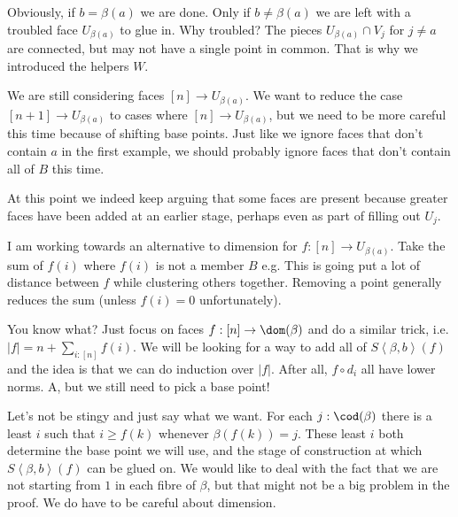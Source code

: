 \documentclass{tac}
\newcommand\of{:}
\newcommand\tuplet[1]{\left\langle #1 \right\rangle}
\begin{document}
Obviously, if $b=\beta(a)$ we are done. Only if $b\neq\beta(a)$ we are left with a troubled face $U_{\beta(a)}$ to glue in. Why troubled? The pieces $U_{\beta(a)}\cap V_j$ for $j\neq a$ are connected, but may not have a single point in common. That is why we introduced the helpers $W$.

We are still considering faces $[n]\to U_{\beta(a)}$. We want to reduce the case $[n + 1]\to U_{\beta(a)}$ to cases where $[n]\to U_{\beta(a)}$, but we need to be more careful this time because of shifting
base points.
Just like we ignore faces that don't contain $a$ in the first example, we should probably ignore faces that don't contain all of $B$ this time.

At this point we indeed keep arguing that some faces are present because
greater faces have been added at an earlier stage, perhaps even as part of filling out $U_j$.

I am working towards an alternative to dimension for $f:[n]\to U_{\beta(a)}$. Take the sum of $f(i)$ where $f(i)$ is not a member $B$ e.g.
This is going put a lot of distance between $f$ while clustering others together. Removing a point generally reduces the sum (unless $f(i) = 0$ unfortunately). 

You know what? Just focus on faces $f:[n]\to \dom(\beta)$ and do a similar trick, i.e. $|f| = n + \sum_{i\of [n]} f(i)$. We
will be looking for a way to add all of $S\tuplet{\beta,b}(f)$ and the
idea is that we can do induction over $|f|$. After all, $f\circ d_i$ all have lower norms. A, but we still need to pick a base point!

Let's not be stingy and just say what we want.
For each $j\of \cod(\beta)$ there is a least $i$ such that $i \geq f(k)$ whenever $\beta(f(k)) = j$. These least $i$ both determine the base point we will use, and the stage of
construction at which $S\tuplet{\beta,b}(f)$ can be glued on. We would
like to deal with the fact that we are not starting from $1$ in each fibre of $\beta$, but that might not be a big problem in the proof. We do have to be careful about dimension.
\end{document}
